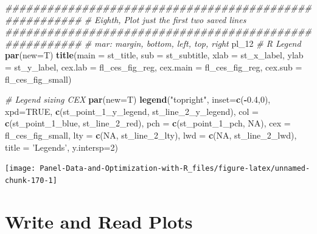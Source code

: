 \documentclass[
]{book}
\newenvironment{Shaded}{\begin{snugshade}}{\end{snugshade}}
\newcommand{\CommentTok}[1]{\textcolor[rgb]{0.56,0.35,0.01}{\textit{#1}}}
\newcommand{\DataTypeTok}[1]{\textcolor[rgb]{0.13,0.29,0.53}{#1}}
\newcommand{\DecValTok}[1]{\textcolor[rgb]{0.00,0.00,0.81}{#1}}
\newcommand{\FloatTok}[1]{\textcolor[rgb]{0.00,0.00,0.81}{#1}}
\newcommand{\KeywordTok}[1]{\textcolor[rgb]{0.13,0.29,0.53}{\textbf{#1}}}
\newcommand{\NormalTok}[1]{#1}
\newcommand{\OperatorTok}[1]{\textcolor[rgb]{0.81,0.36,0.00}{\textbf{#1}}}
\newcommand{\OtherTok}[1]{\textcolor[rgb]{0.56,0.35,0.01}{#1}}
\newcommand{\StringTok}[1]{\textcolor[rgb]{0.31,0.60,0.02}{#1}}
\begin{document}
\begin{Shaded}
\begin{Highlighting}[]
\CommentTok{#######################################################}
\CommentTok{# Eighth, Plot just the first two saved lines}
\CommentTok{#######################################################}
\CommentTok{# mar: margin, bottom, left, top, right}
\NormalTok{pl_}\DecValTok{12}
\CommentTok{# R Legend}
\KeywordTok{par}\NormalTok{(}\DataTypeTok{new=}\NormalTok{T)}
\KeywordTok{title}\NormalTok{(}\DataTypeTok{main =}\NormalTok{ st_title, }\DataTypeTok{sub =}\NormalTok{ st_subtitle, }\DataTypeTok{xlab =}\NormalTok{ st_x_label, }\DataTypeTok{ylab =}\NormalTok{ st_y_label,}
      \DataTypeTok{cex.lab =}\NormalTok{ fl_ces_fig_reg,}
      \DataTypeTok{cex.main =}\NormalTok{ fl_ces_fig_reg,}
      \DataTypeTok{cex.sub =}\NormalTok{ fl_ces_fig_small)}

\CommentTok{# Legend sizing CEX}
\KeywordTok{par}\NormalTok{(}\DataTypeTok{new=}\NormalTok{T)}
\KeywordTok{legend}\NormalTok{(}\StringTok{"topright"}\NormalTok{,}
       \DataTypeTok{inset=}\KeywordTok{c}\NormalTok{(}\OperatorTok{-}\FloatTok{0.4}\NormalTok{,}\DecValTok{0}\NormalTok{),}
       \DataTypeTok{xpd=}\OtherTok{TRUE}\NormalTok{,}
       \KeywordTok{c}\NormalTok{(st_point_}\DecValTok{1}\NormalTok{_y_legend, st_line_}\DecValTok{2}\NormalTok{_y_legend),}
       \DataTypeTok{col =} \KeywordTok{c}\NormalTok{(st_point_}\DecValTok{1}\NormalTok{_blue, st_line_}\DecValTok{2}\NormalTok{_red),}
       \DataTypeTok{pch =} \KeywordTok{c}\NormalTok{(st_point_}\DecValTok{1}\NormalTok{_pch, }\OtherTok{NA}\NormalTok{),}
       \DataTypeTok{cex =}\NormalTok{ fl_ces_fig_small,}
       \DataTypeTok{lty =} \KeywordTok{c}\NormalTok{(}\OtherTok{NA}\NormalTok{, st_line_}\DecValTok{2}\NormalTok{_lty),}
       \DataTypeTok{lwd =} \KeywordTok{c}\NormalTok{(}\OtherTok{NA}\NormalTok{, st_line_}\DecValTok{2}\NormalTok{_lwd),}
       \DataTypeTok{title =} \StringTok{'Legends'}\NormalTok{,}
       \DataTypeTok{y.intersp=}\DecValTok{2}\NormalTok{)}
\end{Highlighting}
\end{Shaded}

\begin{center}\texttt{[image: Panel-Data-and-Optimization-with-R\_files/figure-latex/unnamed-chunk-170-1]} \end{center}

\hypertarget{write-and-read-plots}{%
\section{Write and Read Plots}\label{write-and-read-plots}}
\end{document}
